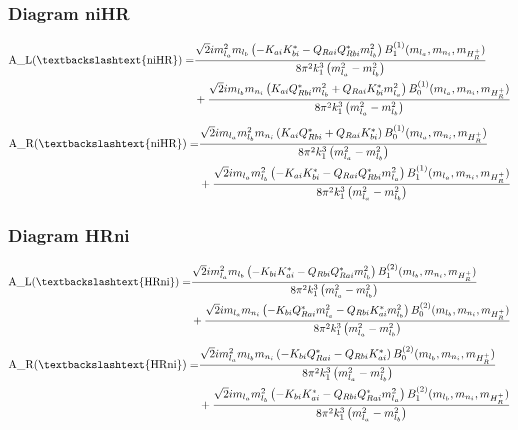 \documentclass{article}
\begin{document}
\subsubsection{Diagram niHR}
\begin{align*}
\mathtt{\text{A\_L(\textbackslashtext\{niHR\})}} = & \frac{\sqrt{2} i m_{l_a}^{2} m_{l_b} \left(- K_{ai} K_{bi}^* - Q_{Rai} Q_{Rbi}^* m_{l_b}^{2}\right) B^{\left(1\right)}_1(m_{l_a}, m_{n_i}, m_{H_R^+})}{8 \pi^{2} k_{1}^{3} \left(m_{l_a}^{2} - m_{l_b}^{2}\right)} \\
& + \frac{\sqrt{2} i m_{l_b} m_{n_i} \left(K_{ai} Q_{Rbi}^* m_{l_b}^{2} + Q_{Rai} K_{bi}^* m_{l_a}^{2}\right) B^{\left(1\right)}_0(m_{l_a}, m_{n_i}, m_{H_R^+})}{8 \pi^{2} k_{1}^{3} \left(m_{l_a}^{2} - m_{l_b}^{2}\right)} 
\end{align*}
\begin{align*}
\mathtt{\text{A\_R(\textbackslashtext\{niHR\})}} = & \frac{\sqrt{2} i m_{l_a} m_{l_b}^{2} m_{n_i} \left(K_{ai} Q_{Rbi}^* + Q_{Rai} K_{bi}^*\right) B^{\left(1\right)}_0(m_{l_a}, m_{n_i}, m_{H_R^+})}{8 \pi^{2} k_{1}^{3} \left(m_{l_a}^{2} - m_{l_b}^{2}\right)} \\
& + \frac{\sqrt{2} i m_{l_a} m_{l_b}^{2} \left(- K_{ai} K_{bi}^* - Q_{Rai} Q_{Rbi}^* m_{l_a}^{2}\right) B^{\left(1\right)}_1(m_{l_a}, m_{n_i}, m_{H_R^+})}{8 \pi^{2} k_{1}^{3} \left(m_{l_a}^{2} - m_{l_b}^{2}\right)} 
\end{align*}
\subsubsection{Diagram HRni}
\begin{align*}
\mathtt{\text{A\_L(\textbackslashtext\{HRni\})}} = & \frac{\sqrt{2} i m_{l_a}^{2} m_{l_b} \left(- K_{bi} K_{ai}^* - Q_{Rbi} Q_{Rai}^* m_{l_b}^{2}\right) B^{\left(2\right)}_1(m_{l_b}, m_{n_i}, m_{H_R^+})}{8 \pi^{2} k_{1}^{3} \left(m_{l_a}^{2} - m_{l_b}^{2}\right)} \\
& + \frac{\sqrt{2} i m_{l_a} m_{n_i} \left(- K_{bi} Q_{Rai}^* m_{l_a}^{2} - Q_{Rbi} K_{ai}^* m_{l_b}^{2}\right) B^{\left(2\right)}_0(m_{l_b}, m_{n_i}, m_{H_R^+})}{8 \pi^{2} k_{1}^{3} \left(m_{l_a}^{2} - m_{l_b}^{2}\right)} 
\end{align*}
\begin{align*}
\mathtt{\text{A\_R(\textbackslashtext\{HRni\})}} = & \frac{\sqrt{2} i m_{l_a}^{2} m_{l_b} m_{n_i} \left(- K_{bi} Q_{Rai}^* - Q_{Rbi} K_{ai}^*\right) B^{\left(2\right)}_0(m_{l_b}, m_{n_i}, m_{H_R^+})}{8 \pi^{2} k_{1}^{3} \left(m_{l_a}^{2} - m_{l_b}^{2}\right)} \\
& + \frac{\sqrt{2} i m_{l_a} m_{l_b}^{2} \left(- K_{bi} K_{ai}^* - Q_{Rbi} Q_{Rai}^* m_{l_a}^{2}\right) B^{\left(2\right)}_1(m_{l_b}, m_{n_i}, m_{H_R^+})}{8 \pi^{2} k_{1}^{3} \left(m_{l_a}^{2} - m_{l_b}^{2}\right)} 
\end{align*}
\end{document}
